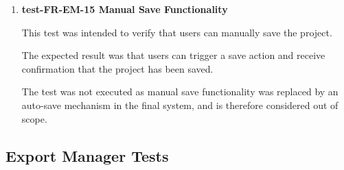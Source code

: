 \documentclass[12pt, titlepage]{article}
\begin{document}
\begin{enumerate}
\hspace{1.5em} These tests were intended to verify that users can reset material and magnetization properties on selected voxels.

The expected result was that selected voxels are restored to their default material and magnetization values.

The test was not executed as this feature was identified as a stretch goal and was not implemented in the final system, and is therefore considered out of scope.



\item \textbf{test-FR-EM-15 Manual Save Functionality}

\hspace{1.5em} This test was intended to verify that users can manually save the project.

The expected result was that users can trigger a save action and receive confirmation that the project has been saved.

The test was not executed as manual save functionality was replaced by an auto-save mechanism in the final system, and is therefore considered out of scope.
\end{enumerate}

\subsection{Export Manager Tests}
\end{document}
